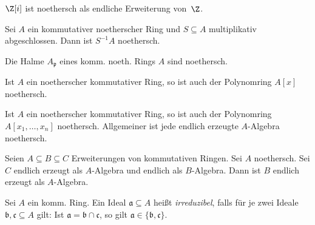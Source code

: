 \documentclass{cheat-sheet}
\newcommand{\aaa}{\mathfrak{a}}
\newcommand{\bbb}{\mathfrak{b}}
\newcommand{\ccc}{\mathfrak{c}}
\newcommand{\ppp}{\mathfrak{p}}
\begin{document}
\begin{bsp}
  $\Z[i]$ ist noethersch als endliche Erweiterung von~$\Z$.
\end{bsp}

\begin{prop}
  Sei $A$ ein kommutativer noetherscher Ring und $S \subseteq A$ multiplikativ abgeschlossen.
  Dann ist $S^{-1} A$ noethersch.
\end{prop}

\begin{kor}
  Die Halme $A_\ppp$ eines komm. noeth. Rings $A$ sind noethersch.
\end{kor}


\begin{satz}
  Ist $A$ ein noetherscher kommutativer Ring, so ist auch der Polynomring $A[x]$ noethersch.
\end{satz}

\begin{kor}
  Ist $A$ ein noetherscher kommutativer Ring, so ist auch der Polynomring $A[x_1, \ldots, x_n]$ noethersch.
  Allgemeiner ist jede endlich erzeugte $A$-Algebra noethersch.
\end{kor}

\begin{prop}
  Seien $A \subseteq B \subseteq C$ Erweiterungen von kommutativen Ringen.
  Sei $A$ noethersch.
  Sei $C$ endlich erzeugt als $A$-Algebra und endlich als $B$-Algebra.
  Dann ist $B$ endlich erzeugt als $A$-Algebra.
\end{prop}



\begin{defn}
  Sei $A$ ein komm. Ring.
  Ein Ideal $\aaa \subseteq A$ heißt \emph{irreduzibel}, falls für je zwei Ideale $\bbb, \ccc \subseteq A$ gilt: \enspace
  Ist $\aaa = \bbb \cap \ccc$, so gilt $\aaa \in \{ \bbb, \ccc \}$.
\end{defn}
\end{document}
